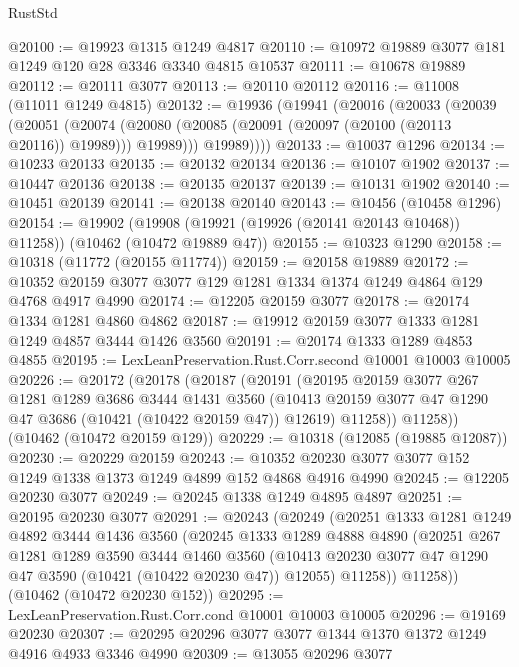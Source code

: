 \begin{lexlean}{RustStd}
\begin{coremodule}
@20100 := @19923 @1315 @1249 @4817
@20110 := @10972 @19889 @3077 @181 @1249 @120 @28 @3346 @3340 @4815 @10537
@20111 := @10678 @19889
@20112 := @20111 @3077
@20113 := @20110 @20112
@20116 := @11008 (@11011 @1249 @4815)
@20132 := @19936
    (@19941
      (@20016
        (@20033
          (@20039
            (@20051
              (@20074 (@20080 (@20085 (@20091 (@20097 (@20100 (@20113 @20116)) @19989))) @19989)))
            @19989))))
@20133 := @10037 @1296
@20134 := @10233 @20133
@20135 := @20132 @20134
@20136 := @10107 @1902
@20137 := @10447 @20136
@20138 := @20135 @20137
@20139 := @10131 @1902
@20140 := @10451 @20139
@20141 := @20138 @20140
@20143 := @10456 (@10458 @1296)
@20154 := @19902
    (@19908 (@19921 (@19926 (@20141 @20143 @10468)) @11258))
    (@10462 (@10472 @19889 @47))
@20155 := @10323 @1290
@20158 := @10318 (@11772 (@20155 @11774))
@20159 := @20158 @19889
@20172 := @10352 @20159 @3077 @3077 @129 @1281 @1334 @1374 @1249 @4864 @129 @4768 @4917 @4990
@20174 := @12205 @20159 @3077
@20178 := @20174 @1334 @1281 @4860 @4862
@20187 := @19912 @20159 @3077 @1333 @1281 @1249 @4857 @3444 @1426 @3560
@20191 := @20174 @1333 @1289 @4853 @4855
@20195 := LexLeanPreservation.Rust.Corr.second @10001 @10003 @10005
@20226 := @20172
    (@20178
      (@20187
        (@20191
          (@20195
            @20159
            @3077
            @267
            @1281
            @1289
            @3686
            @3444
            @1431
            @3560
            (@10413 @20159 @3077 @47 @1290 @47 @3686 (@10421 (@10422 @20159 @47)) @12619)
            @11258))
        @11258))
    (@10462 (@10472 @20159 @129))
@20229 := @10318 (@12085 (@19885 @12087))
@20230 := @20229 @20159
@20243 := @10352 @20230 @3077 @3077 @152 @1249 @1338 @1373 @1249 @4899 @152 @4868 @4916 @4990
@20245 := @12205 @20230 @3077
@20249 := @20245 @1338 @1249 @4895 @4897
@20251 := @20195 @20230 @3077
@20291 := @20243
    (@20249
      (@20251
        @1333
        @1281
        @1249
        @4892
        @3444
        @1436
        @3560
        (@20245
          @1333
          @1289
          @4888
          @4890
          (@20251
            @267
            @1281
            @1289
            @3590
            @3444
            @1460
            @3560
            (@10413 @20230 @3077 @47 @1290 @47 @3590 (@10421 (@10422 @20230 @47)) @12055)
            @11258))
        @11258))
    (@10462 (@10472 @20230 @152))
@20295 := LexLeanPreservation.Rust.Corr.cond @10001 @10003 @10005
@20296 := @19169 @20230
@20307 := @20295 @20296 @3077 @3077 @1344 @1370 @1372 @1249 @4916 @4933 @3346 @4990
@20309 := @13055 @20296 @3077

\end{coremodule}
\end{lexlean}
